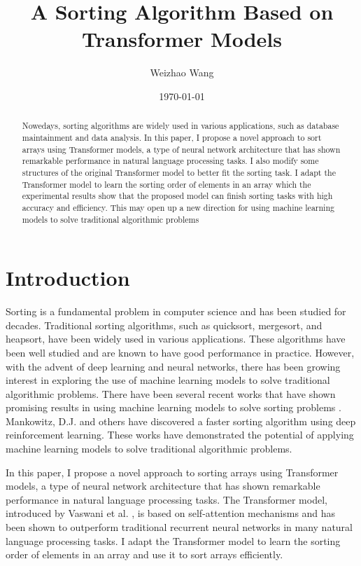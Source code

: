 \documentclass{article}
\author{Weizhao Wang}
\date{\today}
\begin{document}
\title{A Sorting Algorithm Based on Transformer Models}

\maketitle

\begin{abstract}
    Nowedays, sorting algorithms are widely used in various applications, such as database maintainment and data analysis. In this paper, I propose a novel approach to sort arrays using Transformer models, a type of neural network architecture that has shown remarkable performance in natural language processing tasks. I also modify some structures of the original Transformer model to better fit the sorting task. I adapt the Transformer model to learn the sorting order of elements in an array which the experimental results show that the proposed model can finish sorting tasks with high accuracy and efficiency. This may open up a new direction for using machine learning models to solve traditional algorithmic problems
\end{abstract}

\section{Introduction}
Sorting is a fundamental problem in computer science and has been studied for decades. Traditional sorting algorithms, such as quicksort, mergesort, and heapsort, have been widely used in various applications. These algorithms have been well studied and are known to have good performance in practice. However, with the advent of deep learning and neural networks, there has been growing interest in exploring the use of machine learning models to solve traditional algorithmic problems. There have been several recent works that have shown promising results in using machine learning models to solve sorting problems \cite{SortNet}. Mankowitz, D.J. and others \cite{FasterSorting} have discovered a faster sorting algorithm using deep reinforcement learning. These works have demonstrated the potential of applying machine learning models to solve traditional algorithmic problems.

In this paper, I propose a novel approach to sorting arrays using Transformer models, a type of neural network architecture that has shown remarkable performance in natural language processing tasks. The Transformer model, introduced by Vaswani et al. \cite{vaswani2017attention}, is based on self-attention mechanisms and has been shown to outperform traditional recurrent neural networks in many natural language processing tasks. I adapt the Transformer model to learn the sorting order of elements in an array and use it to sort arrays efficiently.
\end{document}

